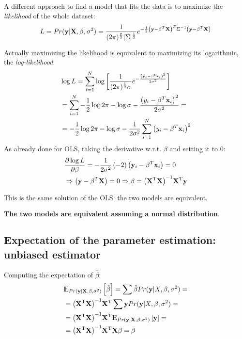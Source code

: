 A different approach to find a model that fits the data is to maximize the \textit{likelihood} of the whole dataset:
\begin{equation}
L = Pr(\mathbf{y}|\mathrm{\mathbf{X}}, \beta, \sigma^2)  = \frac{1}{(2\pi)^{\frac{p}{2}}|\Sigma|^\frac{1}{2}}e^{-\frac{1}{2}\left(\mathbf{y}-\beta^T\mathrm{\mathbf{X}}\right)^T\Sigma^{-1}\left(\mathbf{y}-\beta^T\mathrm{\mathbf{X}}\right)}
\end{equation}

Actually maximizing the likelihood is equivalent to maximizing its logarithmic, the \textit{log-likelihood}:
\begin{equation}
\begin{aligned}
&\log L = \sum_{i=1}^N \log\left[\frac{1}{(2\pi)^{\frac{1}{2}}\sigma}e^{-\frac{\left(\mathbf{y}_i-\beta^t \mathbf{x}_i\right)^2} {2\sigma^2}}\right]\\
&=\sum_{i=1}^N -\frac{1}{2}\log2\pi -\log \sigma -\frac{\left(y_i-\beta^T\mathbf{x}_i\right)^2} {2\sigma^2} =\\
&= -\frac{1}{2}\log2\pi -\log \sigma -\frac{1}{2\sigma^2} \sum_{i=1}^N\left(y_i-\beta^T\mathbf{x}_i\right)^2
\end{aligned}
\end{equation}
As already done for OLS, taking the derivative w.r.t. $\beta$ and setting it to $0$:
\begin{equation}
\begin{aligned}
&\frac{\partial \log L}{\partial \beta} = -\frac{1}{2\sigma^2} \left(-2\right) \left(\mathbf{y}_i-\beta^T\mathbf{x}_i\right) = 0 \\
&\Rightarrow \left(\mathbf{y}-\beta^T\mathrm{\mathbf{X}} \right)= 0 \Rightarrow \beta = \mathrm{\mathrm{\left( \mathrm{\mathbf{X}}^T\mathrm{\mathbf{X}}\right)^{-1}}\mathrm{\mathbf{X}}^T} \mathbf{y}
\end{aligned}
\end{equation}

This is the same solution of the OLS: the two models are equivalent.

\textbf{The two models are equivalent assuming a normal distribution}.

\subsection{Expectation of the parameter estimation: unbiased estimator}
Computing the expectation of $\hat{\beta}$:
\begin{equation}
\begin{aligned}
&{\rm I\kern-.3em E}_{Pr(\mathbf{y}|\mathrm{\mathbf{X}},\beta, \sigma^2)}\left[ \hat{\mathbf{\beta}}\right]= \sum \hat{\mathbf{\beta}} Pr(\mathbf{y}|X, \beta, \sigma^2) =\\
&= \mathrm{\mathrm{\left( \mathrm{\mathbf{X}}^T\mathrm{\mathbf{X}}\right)^{-1}}\mathrm{\mathbf{X}}^T} \sum \mathbf{y} Pr(\mathbf{y} |X, \beta, \sigma^2)  = \\
&=\mathrm{\mathrm{\left( \mathrm{\mathbf{X}}^T\mathrm{\mathbf{X}}\right)^{-1}}\mathrm{\mathbf{X}}^T} {\rm I\kern-.3em E}_{Pr(\mathbf{y} | \mathrm{\mathbf{X}},\beta, \sigma^2)} \left[ \mathbf{y}\right] = \\
&= \mathrm{\mathrm{\left( \mathrm{\mathbf{X}}^T\mathrm{\mathbf{X}}\right)^{-1}}\mathrm{\mathbf{X}}^T} \mathrm{\mathbf{X}} \beta = \beta
\end{aligned}
\end{equation}

